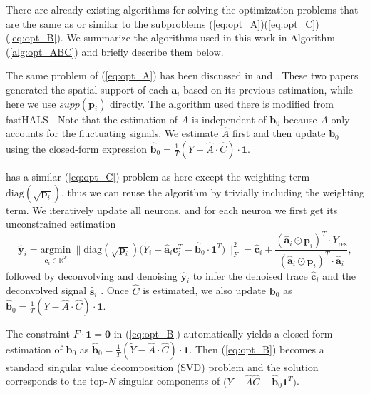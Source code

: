 \documentclass[10pt,letterpaper]{article}
\begin{document}
{There are already existing algorithms for solving the optimization problems that are the same as or similar to the subproblems (\ref{eq:opt_A})(\ref{eq:opt_C})(\ref{eq:opt_B}). We summarize the algorithms used in this work in Algorithm (\ref{alg:opt_ABC}) and briefly describe them below. 

The same problem of (\ref{eq:opt_A}) has been discussed in \citep{Friedrich2017a} and \citep{Zhou2018}. These two papers generated the spatial support of each $\bm{a}_i$ based on its previous estimation, while here we use $supp(\bm{p}_i)$ directly. The algorithm used there is modified from fastHALS \citep{Cichocki2009}. Note that the estimation of $A$ is independent of $\bm{b}_0$ because $A$ only accounts for the fluctuating signals. We estimate $\hat{A}$ first and then update $\bm{b}_0$ using the closed-form expression $\hat{\bm{b}}_0=\frac{1}{T}(Y-\hat{A}\cdot \hat{C})\cdot \bm{1}$.

\citep{Zhou2018} has a similar (\ref{eq:opt_C}) problem as here except the weighting term $\text{diag}(\sqrt{\bm{p}_i})$, thus we can reuse the algorithm by trivially including the weighting term. We iteratively update all neurons, and for each neuron we first get its unconstrained estimation 
\begin{equation}
  \hat{\bm{y}}_i = \underset{\bm{c}_i\in \mathbb{R}^T}{\text{argmin}} ~\|\text{diag}(\sqrt{\bm{p}_i}) \big(\tilde{Y}_i- \hat{\bm{a}}_i\bm{c}_i^T-\hat{\bm{b}}_0\cdot \bm{1}^T\big)\|_F^2 = \hat{\bm{c}}_i + \frac{(\hat{\bm{a}}_i\odot \bm{p}_i)^T\cdot {Y}_{\text{res}}}{(\hat{\bm{a}}_i\odot \bm{p}_i)^T\cdot\hat{\bm{a}}_i},  \label{eq:y_raw}
\end{equation}
followed by deconvolving and denoising $\hat{\bm{y}}_i$ to infer the denoised trace $\hat{\bm{c}}_i$ and the deconvolved signal $\hat{\bm{s}}_i$ \citep{Friedrich2017b}. Once $\hat{C}$ is estimated, we also update $\bm{b}_0$ as  $\hat{\bm{b}}_0=\frac{1}{T}({Y}-\hat{A}\cdot \hat{C})\cdot \bm{1}$.

The constraint $ F\cdot \bm{1} = \bm{0}$ in (\ref{eq:opt_B}) automatically yields a closed-form estimation of $\bm{b}_0$ as  $\hat{\bm{b}}_0=\frac{1}{T}(\tilde{Y}-\hat{A}\cdot \hat{C})\cdot \bm{1}$. Then (\ref{eq:opt_B})  becomes a standard singular value decomposition (SVD) problem and the solution corresponds to the top-$N$ singular components of $\big(Y-\hat{A}\hat{C}-\hat{\bm{b}}_0\bm{1}^T\big)$. 

}
\end{document}
